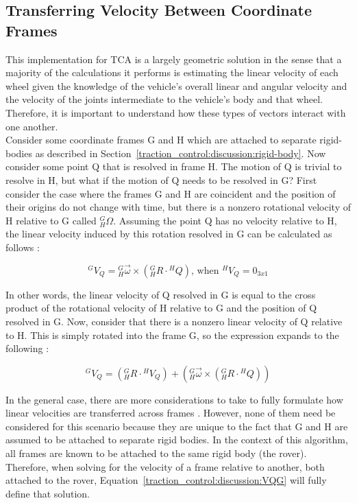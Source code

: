 \subsection{Transferring Velocity Between Coordinate Frames}\label{traction_control:discussion:transferring-velocity}
This implementation for \ac{TCA} is a largely geometric solution in the sense that a majority of the calculations it performs is estimating the linear velocity of each wheel given the knowledge of the vehicle's overall linear and angular velocity and the velocity of the joints intermediate to the vehicle's body and that wheel. Therefore, it is important to understand how these types of vectors interact with one another. \\

Consider some coordinate frames G and H which are attached to separate rigid-bodies as described in Section~\ref{traction_control:discussion:rigid-body}. Now consider some point Q that is resolved in frame H. The motion of Q is trivial to resolve in H, but what if the motion of Q needs to be resolved in G? First consider the case where the frames G and H are coincident and the position of their origins do not change with time, but there is a nonzero rotational velocity of H relative to G called ${}^{G}_{H}\Omega$. Assuming the point Q has no velocity relative to H, the linear velocity induced by this rotation resolved in G can be calculated as follows \cite{craig}:

\begin{equation}
	{}^{G}V_{Q} = {}^{G}_{H}\vec{\omega} \times \left({}^{G}_{H}R \cdot {}^{H}Q\right) \text{, when } {}^{H}V_{Q} = 0_{3x1}
\end{equation}

In other words, the linear velocity of Q resolved in G is equal to the cross product of the rotational velocity of H relative to G and the position of Q resolved in G. Now, consider that there is a nonzero linear velocity of Q relative to H. This is simply rotated into the frame G, so the expression expands to the following \cite{craig}:

\begin{equation}\label{traction_control:discussion:VQG}
	{}^{G}V_{Q} = \left({}^{G}_{H}R \cdot {}^{H}V_{Q}\right) + \left({}^{G}_{H}\vec{\omega} \times \left({}^{G}_{H}R \cdot {}^{H}Q\right)\right)
\end{equation}

In the general case, there are more considerations to take to fully formulate how linear velocities are transferred across frames \cite{craig}. However, none of them need be considered for this scenario because they are unique to the fact that G and H are assumed to be attached to separate rigid bodies. In the context of this algorithm, all frames are known to be attached to the same rigid body (the rover). Therefore, when solving for the velocity of a frame relative to another, both attached to the rover, Equation~\ref{traction_control:discussion:VQG} will fully define that solution.

